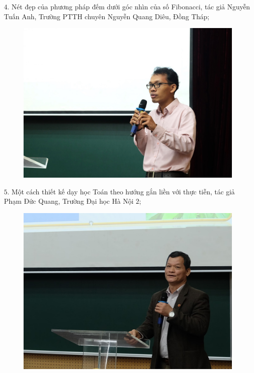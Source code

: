 \begin{multicols}{2}
\begin{figure}[H]
		\vspace*{-15pt}
	\end{figure}
	$4$. Nét đẹp của phương pháp đếm dưới góc nhìn của số Fibonacci, tác giả Nguyễn Tuấn Anh, Trường PTTH chuyên Nguyễn Quang Diêu, Đồng Tháp; 
	\begin{figure}[H]
		\vspace*{-5pt}
		\centering
		\captionsetup{labelformat= empty, justification=centering}
		\includegraphics[width= 1\linewidth]{5}
		\vspace*{-15pt}
	\end{figure}
	$5$. Một cách thiết kế dạy học Toán theo hướng gắn liền với thực tiễn, tác giả Phạm Đức Quang, Trường Đại học Hà Nội $2$; 
	\begin{figure}[H]
		\vspace*{5pt}
		\centering
		\captionsetup{labelformat= empty, justification=centering}
		\includegraphics[width= 1\linewidth]{6}

\end{figure}
\end{multicols}
